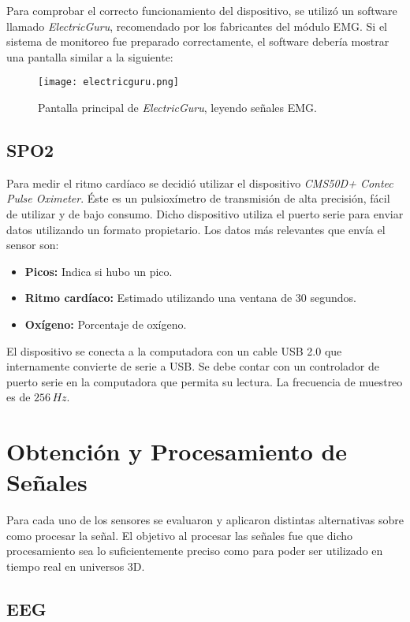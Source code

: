 Para comprobar el correcto funcionamiento del dispositivo, se utilizó un software llamado \emph{ElectricGuru}, recomendado por los fabricantes del módulo EMG. Si el sistema de monitoreo fue preparado correctamente, el software debería mostrar una pantalla similar a la siguiente:

\begin{figure}[H]
	\centering
    \texttt{[image: electricguru.png]}
    \caption{Pantalla principal de \emph{ElectricGuru}, leyendo señales EMG.}
	\label{fig:emg-electricguru}
\end{figure}

\subsection{SPO2}

Para medir el ritmo cardíaco se decidió utilizar el dispositivo \emph{CMS50D+ Contec Pulse Oximeter}. Éste es un pulsioxímetro de transmisión de alta precisión, fácil de utilizar y de bajo consumo. Dicho dispositivo utiliza el puerto serie para enviar datos utilizando un formato propietario. Los datos más relevantes que envía el sensor son:

\begin{itemize}
\item \textbf{Picos:}  Indica si hubo un pico.
\item \textbf{Ritmo cardíaco:} Estimado utilizando una ventana de 30 segundos.
\item \textbf{Oxígeno:} Porcentaje de oxígeno.
\end{itemize} 

El dispositivo se conecta a la computadora con un cable USB 2.0 que internamente convierte de serie a USB. Se debe contar con un controlador de puerto serie en la computadora que permita su lectura. La frecuencia de muestreo es de $256 \, Hz$.

\section{Obtención y Procesamiento de Señales}

Para cada uno de los sensores se evaluaron y aplicaron distintas alternativas sobre como procesar la señal. El objetivo al procesar las señales fue que dicho procesamiento sea lo suficientemente preciso como para poder ser utilizado en tiempo real en universos 3D.

\subsection{EEG} \label{sec:eeg-signal-processing}

